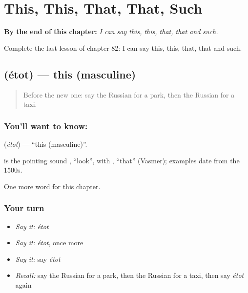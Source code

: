 
\chapter{This, This, That, That, Such}
\label{ch:ru-this-this-that-that-such}

\begin{chapteropening}
\textbf{By the end of this chapter:} \emph{I can say this, this, that, that and such.}

Complete the last lesson of chapter 82: I can say this, this, that, that and such.
\end{chapteropening}

\section[\texorpdfstring{\ru{этот} (étot)}{этот (étot)}]{ (étot) — this (masculine)}

\label{lesson:RU-C82-this}



\begin{quote}
Before the new one: say the Russian for a park, then the Russian for a taxi.
\end{quote}

\subsection*{You'll want to know: }
\textbf{} (\emph{étot}) — \textquotedblleft{}this (masculine)\textquotedblright{}.

\begin{cousinweb}
\textbf{} is the pointing sound \emph{}, \textquotedblleft{}look\textquotedblright{}, with \emph{}, \textquotedblleft{}that\textquotedblright{} (Vasmer); examples date from the 1500s.
\end{cousinweb}

\begin{grammarlens}[title={What you've built}]
One more word for this chapter.
\end{grammarlens}

\subsection*{Your turn}
\begin{itemize}
\raggedright
  \item \emph{Say it:} \emph{étot}
  \item \emph{Say it:} \emph{étot}, once more
  \item \emph{Say it:} say \emph{étot}
  \item \emph{Recall:} say the Russian for a park, then the Russian for a taxi, then say \emph{étot} again
\end{itemize}

